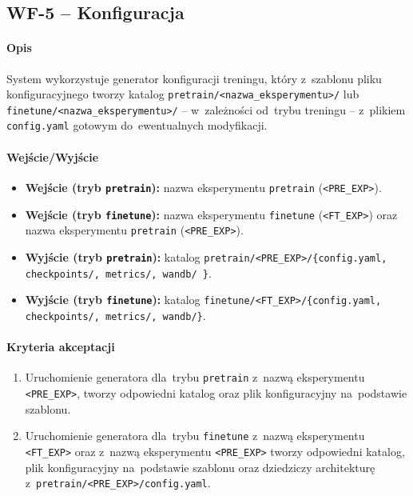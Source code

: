 \documentclass[a4paper,11pt,twoside]{report}
\theoremstyle{definition}
\begin{document}
\subsection{WF-5 -- Konfiguracja}

\paragraph{Opis}
System wykorzystuje generator konfiguracji treningu, który z~szablonu pliku konfiguracyjnego tworzy katalog \texttt{pretrain/<nazwa\_eksperymentu>/} lub \texttt{finetune/<nazwa\_eksperymentu>/} -- w~zależności od~trybu treningu -- z~plikiem \texttt{config.yaml} gotowym do~ewentualnych modyfikacji.

\paragraph{Wejście/Wyjście}
\begin{itemize}
  \item \textbf{Wejście (tryb \texttt{pretrain}):} nazwa eksperymentu \texttt{pretrain} (\texttt{<PRE\_EXP>}).
  \item \textbf{Wejście (tryb \texttt{finetune}):} nazwa eksperymentu \texttt{finetune} (\texttt{<FT\_EXP>}) oraz nazwa eksperymentu \texttt{pretrain} (\texttt{<PRE\_EXP>}).
  \item \textbf{Wyjście (tryb \texttt{pretrain}):} katalog \texttt{pretrain/<PRE\_EXP>/\{config.yaml, checkpoints/, metrics/, wandb/ \}}.
  \item \textbf{Wyjście (tryb \texttt{finetune}):} katalog \texttt{finetune/<FT\_EXP>/\{config.yaml, checkpoints/, metrics/, wandb/\}}.
\end{itemize}

\paragraph{Kryteria akceptacji}
\begin{enumerate}
  \item Uruchomienie generatora dla~trybu \texttt{pretrain} z~nazwą eksperymentu \texttt{<PRE\_EXP>}, tworzy odpowiedni katalog oraz plik konfiguracyjny na~podstawie szablonu.
  \item Uruchomienie generatora dla~trybu \texttt{finetune} z~nazwą eksperymentu \texttt{<FT\_EXP>} oraz z~nazwą eksperymentu \texttt{<PRE\_EXP>} tworzy odpowiedni katalog, plik konfiguracyjny na~podstawie szablonu oraz dziedziczy architekturę z~\texttt{pretrain/<PRE\_EXP>/config.yaml}.
\end{enumerate}
\end{document}
